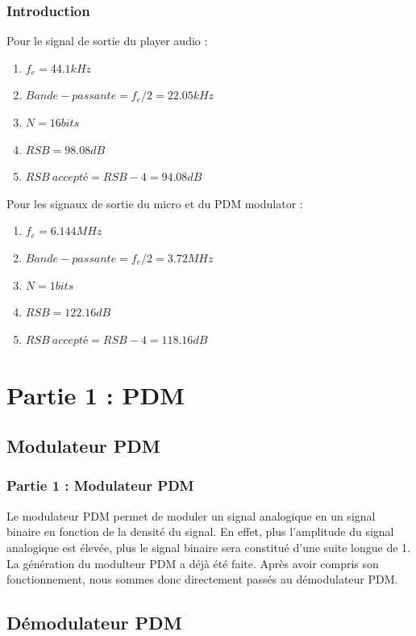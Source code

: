 \documentclass[
10pt,
aspectratio=169,
]{beamer}
\begin{document}
\begin{frame} 
\frametitle{Introduction} 
Pour le signal de sortie du player audio : 
\begin{enumerate} 
\item $f_e = 44.1 kHz$
\item $Bande-passante = f_e/2 = 22.05 kHz$
\item $N = 16 bits$
\item $RSB = 98.08 dB$
\item $RSB ~accepté = RSB - 4 = 94.08 dB$
\end{enumerate}
\vspace*{0.7cm}
Pour les signaux de sortie du micro et du PDM modulator : 
\begin{enumerate} 
\item $f_e = 6.144 MHz$
\item $Bande-passante = f_e/2 = 3.72 MHz$
\item $N = 1 bits$
\item $RSB = 122.16 dB$
\item $RSB~accepté = RSB - 4 = 118.16 dB$
\end{enumerate}
\end{frame}

\section{Partie 1 : PDM}
\subsection{Modulateur PDM}
\begin{frame} 
\frametitle{Partie 1 : Modulateur PDM} 
Le modulateur PDM permet de moduler un signal analogique en un signal binaire en fonction de la densité du signal. En effet, plus l'amplitude du signal analogique est élevée, plus le signal binaire sera constitué d'une suite longue de 1.\\
\vspace*{0.3cm}
La génération du modulteur PDM a déjà été faite. Après avoir compris son fonctionnement, nous sommes donc directement passés au démodulateur PDM.
\end{frame}

\subsection{Démodulateur PDM}
\end{document}

